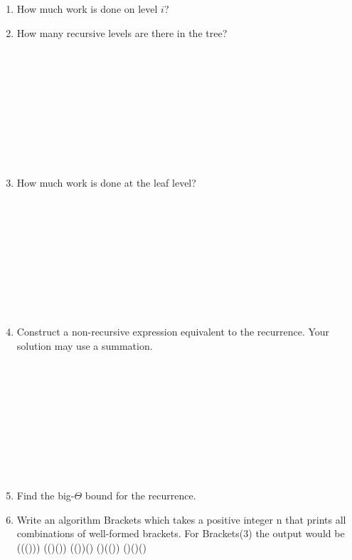 \documentclass[12pt]{article}
\begin{document}
\begin{enumerate}
Draw out a visualization of what this recurrences looks like as a tree.\\\\\\\\\\\\\\\\\\\\\\\\\\\\\\\\\\\\\\\\\\\\\\\\\\\\\\\\\\\\
\noindent \item How much work is done on level $i$?
\newpage 
\noindent \item How many recursive levels are there in the tree?\\\\\\\\\\\\\\\\\\\\
\noindent \item How much work is done at the leaf level?\\\\\\\\\\\\\\\\\\\\
\newpage
\noindent \item Construct a non-recursive expression equivalent to the recurrence. Your solution may use a summation.\\\\\\\\\\\\\\\\\\\\
\noindent \item Find the big-$\Theta$ bound for the recurrence.
\newpage
\noindent \item Write an algorithm Brackets which takes a positive integer n that prints all combinations of well-formed brackets. 
For Brackets(3) the output would be ((())) (()()) (())() ()(()) ()()()
\end{enumerate}
\end{document}
